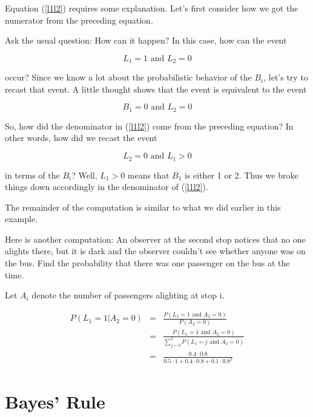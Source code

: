 Equation (\ref{l1l2}) requires some explanation.  Let's first consider
how we got the numerator from the preceding equation.

Ask the usual question:  How can it happen?  In this case, how can the
event 

\begin{equation}
L_1 = 1 \textrm{ and } L_2 = 0
\end{equation}

occur?  Since we know a lot about
the probabilistic behavior of the $B_i$, let's try to recast that event.
A little thought shows that the event is equivalent to the event 

\begin{equation}
B_1 = 0 \textrm{ and } L_2 = 0
\end{equation}

So, how did the denominator in (\ref{l1l2}) come from the preceding
equation?  In other words, how did we recast the event 

\begin{equation}
L_2 = 0 \textrm{ and } L_1 > 0
\end{equation}

in terms of the $B_i$?  Well, $L_1 > 0$ means that $B_1$ is either 1 or
2.  Thus we broke things down accordingly in the denominator of
(\ref{l1l2}).  

The remainder of the computation is similar to what we did earlier in
this example.

Here is another computation:  An observer at the second stop notices
that no one alights there, but it is dark and the observer couldn't see
whether anyone was on the bus. Find the probability that there was one
passenger on the bus at the time.

Let $A_i$ denote the number of passengers alighting at stop i.

\begin{eqnarray}
P(L_1 = 1 | A_2 = 0)
&=& \frac
{P(L_1 = 1 \textrm{ and } A_2 = 0)}
{P(A_2 = 0)} \\ 
&=& \frac
{P(L_1 = 1 \textrm{ and } A_2 = 0)}
{\sum_{j=0}^2
P(L_1 = j \textrm{ and } A_2 = 0)} \\
&=& 
\frac
{0.4 \cdot 0.8}
{0.5 \cdot 1 + 0.4 \cdot 0.8 + 0.1 \cdot 0.8^2}
\end{eqnarray}

\section{Bayes' Rule}
\label{bayesthm}

